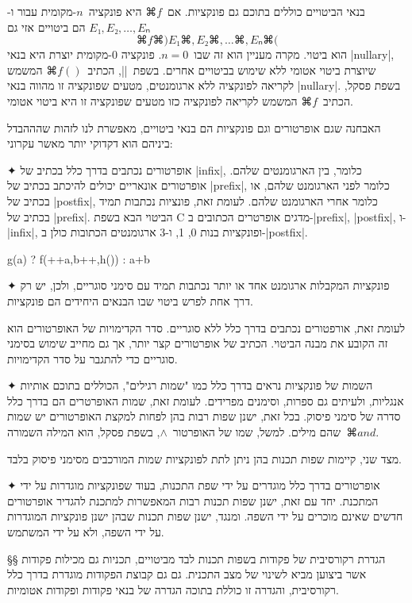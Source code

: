 בנאי הביטויים כוללים בתוכם גם פונקציות. אם~$⌘f$ היא פונקציה~$n$-מקומית עבור
ו-$E₁,E₂,…,Eₙ$ הם ביטויים אזי גם
\[
⌘f⌘)E₁⌘,E₂⌘,…⌘,Eₙ⌘(
\]
הוא ביטוי.  מקרה מעניין הוא זה שבו~$n=0$. פונקציה 0-מקומית יוצרת היא בנאי
\E|nullary|, שיוצרת ביטוי אטומי ללא שימוש בביטויים אחרים.  בשפת~\E|\CPL|,
הכתיב~$⌘{f()}$ המשמש לקריאה לפונקציה ללא ארגומנטים, מטעים שפונקציה זו מהווה
בנאי \E|nullary|.  בשפת פסקל, הכתיב~$⌘f$ המשמש לקריאה לפונקציה כזו מטעים
שפונקציה זו היא ביטוי אטומי.

האבחנה שגם אופרטורים וגם פונקציות הם בנאי ביטויים, מאפשרת לנו לזהות שהההבדל
ביניהם הוא דקדוקי יותר מאשר עקרוני:

✦ אופרטורים נכתבים בדרך כלל בכתיב של \E|infix|, כלומר, בין הארגומנטים שלהם.
אופרטורים אונאריים יכולים להיכתב בכתיב של \E|prefix|, כלומר לפני הארגומנט שלהם,
או בכתיב של \E|postfix|, כלומר אחרי הארגומנט שלהם. לעומת זאת, פונציות נכתבות
תמיד בכתיב של \E|prefix|.
הביטוי הבא בשפת C מדגים אופרטרים הכתובים ב-\E|prefix|, \E|postfix|, ו-\E|infix|,
ופונקציות בנות 0, 1, ו-3 ארגומנטים הכתובות כולן ב-\E|postfix|.
\begin{CPP}
     g(a) ? f(++a,b++,h()) : a+b
\end{CPP}
✦ פונקציות המקבלות ארגומנט אחד או יותר נכתבות תמיד עם סימני סוגריים, ולכן, יש
רק דרך אחת לפרש ביטוי שבו הבנאים היחידים הם פונקציות.

לעומת זאת, אורפטורים נכתבים בדרך כלל ללא סוגריים. סדר הקדימויות של האופרטורים
הוא זה הקובע את מבנה הביטוי. הכתיב של אופרטורים קצר יותר, אך גם מחייב
שימוש בסימני סוגריים כדי להתגבר על סדר הקדימויות.

✦ השמות של פונקציות נראים בדרך כלל כמו "שמות רגילים", הכוללים בתוכם אותיות
אנגליות, ולעיתים גם ספרות, וסימנים מפרידים. לעומת זאת, שמות האופרטרים הם בדרך
כלל סדרה של סימני פיסוק. בכל זאת, ישנן שפות רבות בהן לפחות למקצת האופרטורים יש
שמות שהם מילים. למשל, שמו של האופרטור~$∧$, בשפת פסקל, הוא המילה
השמורה~$⌘{and}$.

מצד שני, קיימות שפות תכנות בהן ניתן לתת לפונקציות שמות המורכבים מסימני פיסוק
בלבד.

✦ אופרטורים בדרך כלל מוגדרים על ידי שפת התכנות, בעוד שפונקציות מוגדרות על ידי
  המתכנת. יחד עם זאת, ישנן שפות תכנות רבות המאפשרות למתכנת להגדיר אופרטורים
  חדשים שאינם מוכרים על ידי השפה. ומנגד, ישנן שפות תכנות שבהן ישנן פונקציות
  המוגדרות על ידי השפה, ולא על ידי המשתמש.

§§ הגדרת רקורסיבית של פקודות בשפות תכנות
לבד מביטויים, תכניות גם מכילות פקודות אשר ביצוען מביא לשינוי של מצב התכנית. גם
גם קבוצת הפקודות מוגדרת בדרך כלל רקורסיבית, והגדרה זו כוללת בתוכה
הגדרה של בנאי פקודות ופקודות אטומיות.

